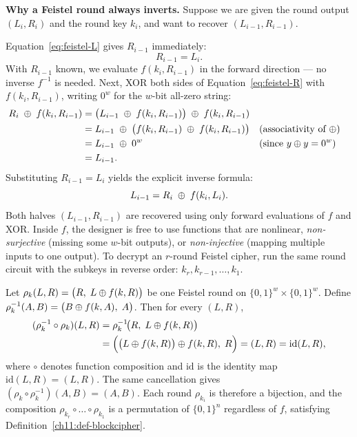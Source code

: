 \begin{whybox}
\textbf{Why a Feistel round always inverts.} Suppose we are given the round output $(L_i, R_i)$ and the round key $k_i$, and want to recover $(L_{i-1}, R_{i-1})$.

Equation~\eqref{eq:feistel-L} gives $R_{i-1}$ immediately:
\[
R_{i-1} = L_i.
\]
With $R_{i-1}$ known, we evaluate $f(k_i, R_{i-1})$ in the forward direction --- no inverse $f^{-1}$ is needed. Next, XOR both sides of Equation~\eqref{eq:feistel-R} with $f(k_i, R_{i-1})$, writing $0^w$ for the $w$-bit all-zero string:
\begin{align*}
R_i \;\oplus\; f(k_i, R_{i-1}) &= \bigl(L_{i-1} \;\oplus\; f(k_i, R_{i-1})\bigr) \;\oplus\; f(k_i, R_{i-1}) \\
&= L_{i-1} \;\oplus\; \bigl(f(k_i, R_{i-1}) \;\oplus\; f(k_i, R_{i-1})\bigr) && \text{(associativity of $\oplus$)} \\
&= L_{i-1} \;\oplus\; 0^w && \text{(since $y \oplus y = 0^w$)} \\
&= L_{i-1}.
\end{align*}
Substituting $R_{i-1} = L_i$ yields the explicit inverse formula:
\[
L_{i-1} = R_i \;\oplus\; f(k_i, L_i).
\]
Both halves $(L_{i-1}, R_{i-1})$ are recovered using only forward evaluations of $f$ and XOR. Inside $f$, the designer is free to use functions that are nonlinear, \emph{non-surjective} (missing some $w$-bit outputs), or \emph{non-injective} (mapping multiple inputs to one output). To decrypt an $r$-round Feistel cipher, run the same round circuit with the subkeys in reverse order: $k_r, k_{r-1}, \dots, k_1$.
\end{whybox}

\begin{formalbox}
\label{ch11:feistel-formal}
Let $\rho_{k}(L,R) = \bigl(R,\; L \oplus f(k,R)\bigr)$ be one Feistel round on $\{0,1\}^w \times \{0,1\}^w$. Define $\rho_k^{-1}(A,B) = \bigl(B \oplus f(k,A),\; A\bigr)$. Then for every $(L, R)$,
\begin{align*}
(\rho_k^{-1} \circ \rho_k)(L, R)
  &= \rho_k^{-1}\!\bigl(R,\; L \oplus f(k,R)\bigr) \\
  &= \Bigl(\bigl(L \oplus f(k,R)\bigr) \oplus f(k,R),\; R\Bigr) = (L, R) = \mathrm{id}(L, R),
\end{align*}
where $\circ$ denotes function composition and $\mathrm{id}$ is the identity map $\mathrm{id}(L,R) = (L,R)$. The same cancellation gives $(\rho_k \circ \rho_k^{-1})(A,B) = (A,B)$. Each round $\rho_{k_i}$ is therefore a bijection, and the composition $\rho_{k_r} \circ \dots \circ \rho_{k_1}$ is a permutation of $\{0,1\}^n$ regardless of $f$, satisfying Definition~\ref{ch11:def-blockcipher}.
\end{formalbox}


